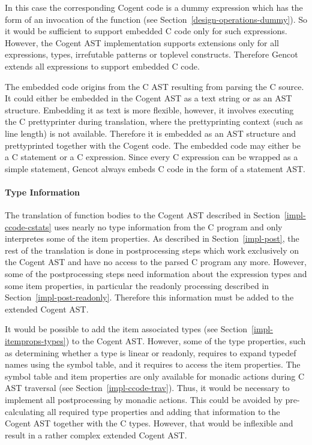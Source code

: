 In this case the corresponding Cogent code is a dummy expression which has the form of an invocation of the function
 (see Section~\ref{design-operations-dummy}). So it would be sufficient to support embedded C code
only for such expressions. However, the Cogent AST implementation supports extensions only for all expressions, types, 
irrefutable patterns or toplevel constructs. Therefore Gencot extends all expressions to support embedded C code.

The embedded code origins from the C AST resulting from parsing the C source. It could either be embedded in the Cogent 
AST as a text string or as an AST structure. Embedding it as text is more flexible, however, it involves executing the 
C prettyprinter during translation, where the prettyprinting context (such as line length) is not available. Therefore 
it is embedded as an AST structure and prettyprinted together with the Cogent code. The embedded code may either be a 
C statement or a C expression. Since every C expression can be wrapped as a simple statement, Gencot always embeds C
code in the form of a statement AST.

\paragraph{Type Information}

The translation of function bodies to the Cogent AST described in Section~\ref{impl-ccode-cstats} uses nearly no type 
information from the C program and only interpretes some of the item properties. As described in Section~\ref{impl-post}, the
rest of the translation is done in postprocessing steps which work exclusively on the Cogent AST and have no access to
the parsed C program any more. However, some of the postprocessing steps need information about the expression types and
some item properties, in particular the readonly processing described in Section~\ref{impl-post-readonly}. Therefore
this information must be added to the extended Cogent AST.

It would be possible to add the item associated types (see Section~\ref{impl-itemprops-types}) to the Cogent AST. However, 
some of the type properties, such as determining whether a type is linear or readonly, requires to expand typedef names
using the symbol table, and it requires to access the item properties. The symbol table and item properties are only 
available for monadic actions during C AST traversal (see Section~\ref{impl-ccode-trav}). Thus, it would be necessary to
implement all postprocessing by monadic actions. This could be avoided by pre-calculating all required type properties
and adding that information to the Cogent AST together with the C types. However, that would be inflexible and result in
a rather complex extended Cogent AST.

